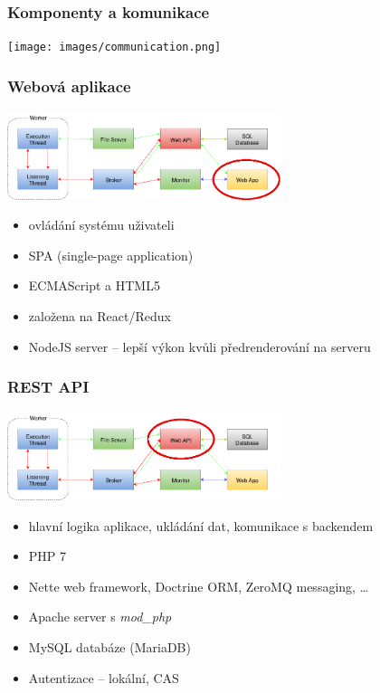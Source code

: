 \documentclass{beamer}
\begin{document}
\begin{frame}
	\frametitle{Komponenty a komunikace}
	\begin{center}
		\texttt{[image: images/communication.png]}
	\end{center}
\end{frame}

\begin{frame}
	\frametitle{Webová aplikace}
	\begin{center}
		\includegraphics[width=0.6\textwidth]{images/communication-webapp.png}
	\end{center}
	\begin{itemize}
		\item ovládání systému uživateli
		\item SPA (single-page application)
		\item ECMAScript a HTML5
		\item založena na React/Redux
		\item NodeJS server -- lepší výkon kvůli předrenderování na serveru
	\end{itemize}
\end{frame}

\begin{frame}
	\frametitle{REST API}
	\begin{center}
		\includegraphics[width=0.6\textwidth]{images/communication-webapi.png}
	\end{center}
	\begin{itemize}
		\item hlavní logika aplikace, ukládání dat, komunikace s backendem
		\item PHP 7
		\item Nette web framework, Doctrine ORM, ZeroMQ messaging, \dots
		\item Apache server s {\it mod\_php}
		\item MySQL databáze (MariaDB)
		\item Autentizace -- lokální, CAS
	\end{itemize}
\end{frame}
\end{document}
